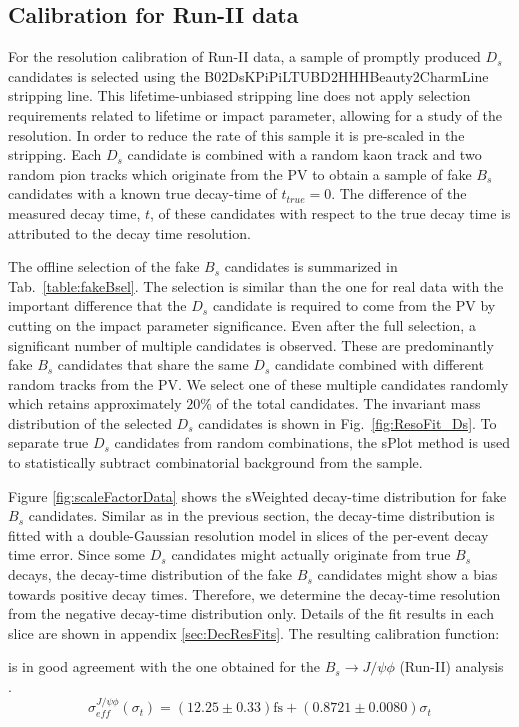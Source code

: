 \subsection{Calibration for Run-II data }

For the resolution calibration of Run-II data, a sample of promptly produced $D_s$ candidates is selected
using the \textsf{B02DsKPiPiLTUBD2HHHBeauty2CharmLine} stripping line.
This lifetime-unbiased stripping line does not apply selection requirements related to lifetime or impact parameter, allowing for a study of the resolution. 
In order to reduce the rate of this sample it is pre-scaled in the stripping.
Each $D_s$ candidate is combined with a random kaon track and two random pion tracks which originate from the PV to obtain a sample of fake $B_s$ candidates with a known true decay-time of $t_{true} = 0$. 
The difference of the measured decay time, $t$, of these candidates with respect to the true decay time is attributed to the decay time resolution. 


The offline selection of the fake $B_s$ candidates is summarized in Tab.~\ref{table:fakeBsel}.
The selection is similar than the one for real data with the important difference that the $D_s$ candidate is required to come from the PV by cutting on the impact parameter significance.
Even after the full selection, a significant number of multiple candidates is observed.
These are predominantly fake $B_s$ candidates that share the same $D_s$ candidate combined with different random tracks from the PV.
We select one of these multiple candidates randomly which retains approximately $20\%$ of the total candidates.
The invariant mass distribution of the selected $D_s$ candidates is shown in Fig.~\ref{fig:ResoFit_Ds}.
To separate true $D_s$ candidates from random combinations, the \textsf{sPlot} method is used to statistically subtract combinatorial background from the sample.

Figure \ref{fig:scaleFactorData} shows the \textsf{sWeighted} decay-time distribution for fake $B_s$ candidates.
Similar as in the previous section, the decay-time distribution is fitted with a double-Gaussian resolution model in slices of the per-event decay time error.
Since some $D_s$ candidates might actually originate from true $B_s$ decays, the decay-time distribution of the fake $B_s$ candidates 
might show a bias towards positive decay times. 
Therefore, we determine the decay-time resolution from the negative decay-time distribution only.
Details of the fit results in each slice are shown in appendix \ref{sec:DecResFits}. 
The resulting calibration function:

is in good agreement with the one obtained for the $B_s \to J/\psi \phi$ (Run-II) analysis \cite{LHCb-ANA-2017-028}. 
\begin{equation}
\sigma_{eff}^{J/\psi\phi}(\sigma_t) = \left( 12.25 \pm 0.33 \right) \text{fs} + \left( 0.8721 \pm 0.0080 \right) \sigma_t
\label{eq:scaleFactorJpsiPhi}
\end{equation}

